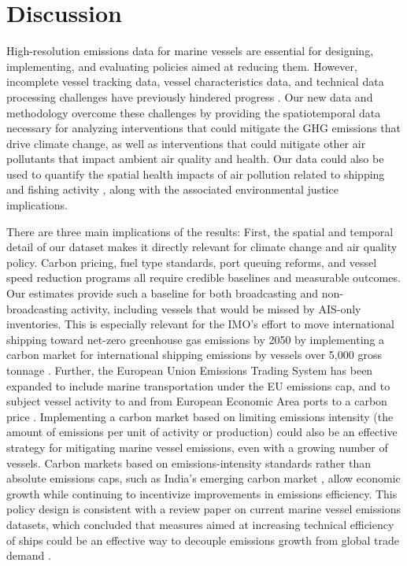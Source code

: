 \documentclass[lineno,pdflatex,sn-nature]{sn-jnl}
\begin{document}
\section{Discussion}

High-resolution emissions data for marine vessels are essential for designing, implementing, and evaluating policies aimed at reducing them. However, incomplete vessel tracking data, vessel characteristics data, and technical data processing challenges have previously hindered progress \cite{chen2024analysis}. Our new data and methodology overcome these challenges by providing the spatiotemporal data necessary for analyzing interventions that could mitigate the GHG emissions that drive climate change, as well as interventions that could mitigate other air pollutants that impact ambient air quality and health. Our data could also be used to quantify the spatial health impacts of air pollution related to shipping and fishing activity \cite{zhang2021global}, along with the associated environmental justice implications.

There are three main implications of the results: First, the spatial and temporal detail of our dataset makes it directly relevant for climate change and air quality policy. Carbon pricing, fuel type standards, port queuing reforms, and vessel speed reduction programs all require credible baselines and measurable outcomes. Our estimates provide such a baseline for both broadcasting and non-broadcasting activity, including vessels that would be missed by AIS-only inventories. This is especially relevant for the IMO's effort to move international shipping toward net-zero greenhouse gas emissions by 2050 by implementing a carbon market for international shipping emissions by vessels over 5,000 gross tonnage \cite{imo_carbon_price, IMO2025NetZero, kang2026maritime}. Further, the European Union Emissions Trading System has been expanded to include marine transportation under the EU emissions cap, and to subject vessel activity to and from European Economic Area ports to a carbon price \cite{kotzampasakis2025maritime}. Implementing a carbon market based on limiting emissions intensity (the amount of emissions per unit of activity or production) could also be an effective strategy for mitigating marine vessel emissions, even with a growing number of vessels. Carbon markets based on emissions-intensity standards rather than absolute emissions caps, such as India's emerging carbon market \cite{gupta2023assessing}, allow economic growth while continuing to incentivize improvements in emissions efficiency. This policy design is consistent with a review paper on current marine vessel emissions datasets, which concluded that measures aimed at increasing technical efficiency of ships could be an effective way to decouple emissions growth from global trade demand \cite{dengreview}.
\end{document}
